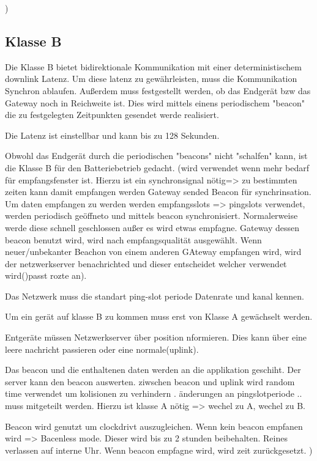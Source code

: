 \documentclass[a4paper,12pt]{article}
\begin{document}
                        )
        \subsection{Klasse B}
            Die Klasse B bietet bidirektionale Kommunikation mit einer deterministischem downlink Latenz. Um diese latenz zu gewährleisten, muss die Kommunikation Synchron ablaufen. Außerdem muss festgestellt werden, ob das Endgerät bzw das Gateway noch in Reichweite ist. Dies wird mittels einens periodischem "beacon" die zu festgelegten
            Zeitpunkten gesendet werde realisiert.

            Die Latenz ist einstellbar und kann bis zu 128 Sekunden.

            Obwohl das Endgerät durch die periodischen "beacons" nicht "schalfen" kann, ist die Klasse B für den Batteriebetrieb gedacht.
            \cite{LoRaSpec}(wird verwendet wenn mehr bedarf für empfangsfenster ist. Hierzu ist ein synchronsignal nötig=> zu bestimmten zeiten kann damit empfangen werden
                Gateway sended Beacon für synchrinsation. Um daten empfangen zu werden werden empfangsslots => pingslots verwendet, werden periodisch geöffneto und mittels beacon synchronisiert. Normalerweise werde diese schnell geschlossen außer es wird etwas empfagne.
                Gateway dessen beacon benutzt wird, wird nach empfangsqualität ausgewählt. Wenn neuer/unbekanter Beachon von einem anderen GAteway empfangen wird, wird der netzwerkserver benachrichted und dieser entscheidet welcher verwendet wird()passt rozte an).

                Das Netzwerk muss die standart ping-slot periode Datenrate und kanal kennen.

                Um ein gerät auf klasse B zu kommen muss erst von Klasse A gewächselt werden.

                Entgeräte müssen Netzwerkserver über position nformieren. Dies kann über eine leere nachricht passieren oder eine normale(uplink).
                
                Das beacon und die enthaltenen daten werden an die applikation geschiht. Der server kann den beacon auswerten. ziwschen beacon und uplink wird random time verwendet um kolisionen zu verhindern .
                änderungen an pingslotperiode .. muss mitgeteilt werden. Hierzu ist klasse A nötig => wechel zu A, wechel zu B.
            
                Beacon wird genutzt um clockdrivt auszugleichen. Wenn kein beacon empfanen wird  => Bacenless mode. Dieser wird bis zu 2 stunden beibehalten. Reines verlassen auf interne Uhr. Wenn beacon empfagne wird, wird zeit zurückgesetzt.
            )
\end{document}
